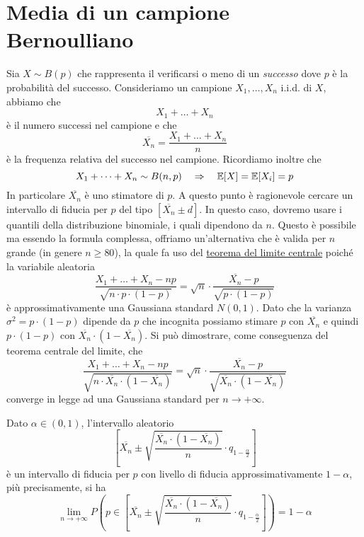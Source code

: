 \section{Media di un campione Bernoulliano}
Sia $X \sim B(p)$ che rappresenta il verificarsi o meno di un \emph{successo} dove $p$ è la
probabilità del successo. Consideriamo un campione $X_1, \dots, X_n$ i.i.d. di $X$, abbiamo che
\[ X_1 + \dots + X_n \]
è il numero successi nel campione e che
\[ \overline{X_n} = \frac{X_1 + \dots + X_n}{n} \]
è la frequenza relativa del successo nel campione. Ricordiamo inoltre che
\[ X_1 + \dots + X_n \sim B(n,p) \quad \Rightarrow \quad \mathbb{E}[X] = \mathbb{E}[X_i] = p \]
In particolare $\overline{X_n}$ è uno stimatore di $p$. A questo punto è ragionevole cercare un
intervallo di fiducia per $p$ del tipo $[\overline{X_n} \pm d]$. In questo caso, dovremo usare i
quantili della distribuzione binomiale, i quali dipendono da $n$. Questo è possibile ma essendo
la formula complessa, offriamo un'alternativa che è valida per $n$ grande (in genere $n \geq 80$),
la quale fa uso del \hyperref[th: tlc]{teorema del limite centrale} poiché la variabile aleatoria
\[
	\frac{X_1 + \dots + X_n - np}{\sqrt{n \cdot p \cdot (1-p)}} =
	\sqrt{n} \cdot \frac{\overline{X_n} - p}{\sqrt{p \cdot (1-p)}}
\]
è approssimativamente una Gaussiana standard $N(0,1)$. Dato che la varianza
$\sigma^2 = p \cdot (1-p)$ dipende da $p$ che incognita possiamo stimare $p$ con $\overline{X_n}$
e quindi $p \cdot (1-p)$ con $\overline{X_n} \cdot (1 - \overline{X_n})$. Si può dimostrare, come
conseguenza del teorema centrale del limite, che
\[
	\frac{X_1 + \dots + X_n - np}{\sqrt{n \cdot \overline{X_n} \cdot (1 - \overline{X_n})}} =
	\sqrt{n} \cdot \frac{\overline{X_n} - p}{\sqrt{\overline{X_n} \cdot (1 - \overline{X_n})}}
\]
converge in legge ad una Gaussiana standard per $n \to +\infty$.

\begin{proposition}
	Dato $\alpha \in (0,1)$, l'intervallo aleatorio
	\[
		\left[
			\overline{X_n} \pm \sqrt{\frac{\overline{X_n} \cdot (1 - \overline{X_n})}{n}}
			\cdot q_{1 - \frac{\alpha}{2}}
			\right]
	\]
	è un intervallo di fiducia per $p$ con livello di fiducia approssimativamente $1-\alpha$, più
	precisamente, si ha
	\[
		\lim_{n \to +\infty} P \left( p \in \left[ \overline{X_n} \pm
			\sqrt{\frac{\overline{X_n} \cdot (1 - \overline{X_n})}{n}} \cdot
			q_{1 - \frac{\alpha}{2}} \right] \right) = 1 - \alpha
	\]
\end{proposition}

